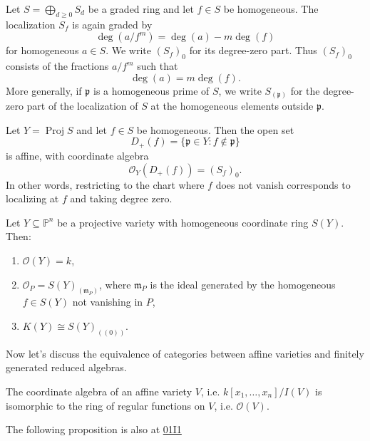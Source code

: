 \begin{definition}
\label{definition-degree-zero-localization}
Let $S=\bigoplus_{d\geq 0} S_d$ be a
graded ring and let $f \in S$ be
homogeneous.
The localization $S_f$ is again graded by
\[
\deg(a/f^m)=\deg(a)-m\deg(f)
\]
for homogeneous $a \in S$.
We write $(S_f)_0$ for its degree-zero
part.
Thus $(S_f)_0$ consists of the fractions
$a/f^m$ such that
\[
\deg(a)=m\deg(f).
\]
More generally, if $\mathfrak{p}$ is a
homogeneous prime of $S$, we write
$S_{(\mathfrak{p})}$ for the degree-zero
part of the localization of $S$ at the
homogeneous elements outside
$\mathfrak{p}$.
\end{definition}

\begin{proposition}
\label{proposition-standard-open-proj}
Let $Y=\operatorname{Proj} S$ and let
$f \in S$ be homogeneous.
Then the open set
\[
D_+(f)=\{\mathfrak{p}\in Y:f\notin
\mathfrak{p}\}
\]
is affine, with coordinate algebra
\[
\mathcal{O}_Y(D_+(f))=(S_f)_0.
\]
In other words, restricting to the chart
where $f$ does not vanish corresponds to
localizing at $f$ and taking degree zero.
\end{proposition}

\begin{theorem}
\label{theorem-functions-projective-case}
\begin{reference}
\cite[Theorem 3.4]{har}
\end{reference}
Let $Y \subseteq \mathbb{P}^n$ be a
projective variety
with homogeneous coordinate ring $S(Y)$.
Then:
\begin{enumerate}
\item $\mathcal{O}(Y)=k$,
\item
$\mathcal{O}_P=S(Y)_{(\mathfrak{m}_P)}$,
where $\mathfrak{m}_P$ is the ideal generated
by the homogeneous
$f \in S(Y)$ not vanishing in $P$,
\item $K(Y)\cong S(Y)_{((0))}$.
\end{enumerate}
\end{theorem}

\noindent
Now let's discuss the equivalence of
categories between
affine varieties and finitely generated
reduced algebras.

\begin{proposition}
\label{proposition-coordinate-algebra}
The coordinate algebra of an affine variety
$V$,
i.e. $k[x_1,…,x_n]/I(V)$ is isomorphic to
the ring of regular functions on $V$, i.e.
$\mathcal{O}(V)$.
\end{proposition}
The following proposition is also at
\href{https://stacks.math.columbia.edu/tag/%
01I1}{01I1}

